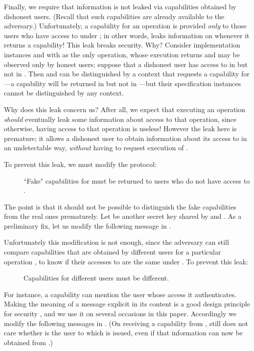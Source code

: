 \documentclass[10pt]{article}
\makeatletter
\newcounter{Crules}
\newcommand{\R}{\addtocounter{Crules}{1}R\arabic{Crules}\gdef\@currentlabel{\arabic{Crules}}}
\makeatother
\begin{document}
Finally, we require that information is not leaked via capabilities obtained by dishonest users. (Recall that such capabilities are already available to the adversary.) Unfortunately, a capability for an operation  is provided \emph{only} to those users who have access to  under ; in other words,  leaks information on  whenever it returns a capability! This leak breaks security.
Why? Consider implementation instances  and  with  as the only operation, whose execution returns  and may be observed only by honest users; suppose that a dishonest user has access to  in  but not in . Then  and  can be distinguished by a context that requests a capability for ---a capability will be returned in  but not in ---but their specification instances cannot be distinguished by any context. 

Why does this leak concern us? After all, we expect that executing an operation \emph{should} eventually leak some information about access to that operation, since otherwise, having access to that operation is useless! However the leak here is premature; it allows a dishonest user to obtain information about its access to  in an undetectable way, \emph{without} having to request execution of .

To prevent this leak, we must modify the protocol:
\begin{description}
\item[\R]\label{Rfake} ``Fake" capabilities for  must be returned to users who do not have access to . 
\end{description}
The point is that it should not be possible to distinguish the fake capabilities from the real ones prematurely. Let  be another secret key shared by  and . As a preliminary fix, let us modify the following message in . 

Unfortunately this modification is not enough, since the adversary can still compare capabilities that are obtained by different users for a particular operation , to know if their accesses to  are the same under . To prevent this leak:\begin{description}
\item[\R]\label{Rdiff} Capabilities for different users must be different.
\end{description}
For instance, a capability can mention the user whose access it authenticates.
Making the meaning of a message explicit in its content is a good design principle for security \cite{Abadi96}, and we use it on several occasions in this paper. Accordingly we modify the following messages in . 
(On receiving a capability  from ,  still does not care whether  is the user to which  is issued, even if that information can now be obtained from .)
\end{document}

